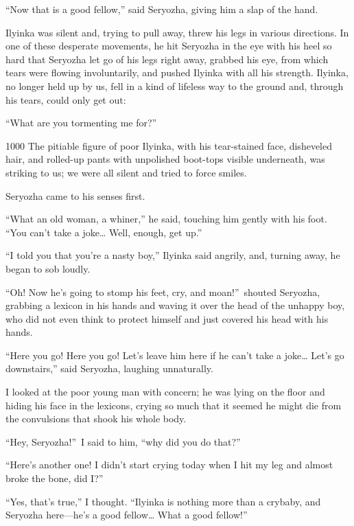 ``Now that is a good fellow,'' said Seryozha, giving him a slap of the hand. %

Ilyinka was silent and, trying to pull away, threw his legs in various directions. In one of these desperate movements, he hit Seryozha in the eye with his heel so hard that Seryozha let go of his legs right away, grabbed his eye, from which tears were flowing involuntarily, and pushed Ilyinka with all his strength. Ilyinka, no longer held up by us, fell in a kind of lifeless way to the ground and, through his tears, could only get out:

``What are you tormenting me for?'' %

\begin{tolerant}{1000}
The pitiable figure of poor Ilyinka, with his tear-stained face, disheveled hair, and rolled-up pants with unpolished boot-tops visible underneath, was striking to us; we were all silent and tried to force smiles.
\end{tolerant}

Seryozha came to his senses first.

``What an old woman, a whiner,'' he said, touching him gently with his foot. ``You can't take a joke\ldots{} Well, enough, get up.'' %

``I told you that you're a nasty boy,'' Ilyinka said angrily, and, turning away, he began to sob loudly. %

``Oh! Now he's going to stomp his feet, cry, and moan!''~shouted Seryozha, grabbing a lexicon in his hands and waving it over the head of the unhappy boy, who did not even think to protect himself and just covered his head with his hands.

``Here you go! Here you go! Let's leave him here if he can't take a joke\ldots{} Let's go downstairs,'' said Seryozha, laughing unnaturally. %

I looked at the poor young man with concern; he was lying on the floor and hiding his face in the lexicons, crying so much that it seemed he might die from the convulsions that shook his whole body.

``Hey, Seryozha!''~I said to him, ``why did you do that?'' %

``Here's another one! I didn't start crying today when I hit my leg and almost broke the bone, did I?'' %

``Yes, that's true,'' I thought. ``Ilyinka is nothing more than a crybaby, and Seryozha here---he's a good fellow\ldots{} What a good fellow!'' %

